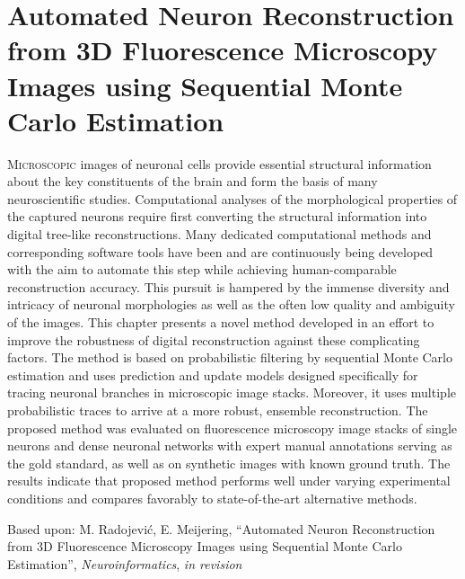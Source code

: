 %
%
\chpos{15mm}{8mm}
\chapter[Automated Neuron Reconstruction from 3D Fluorescence Microscopy Images using Sequential Monte Carlo Estimation]{Automated Neuron Reconstruction from 3D Fluorescence Microscopy Images using Sequential Monte Carlo Estimation}
\label{ch4:pnr}
{\small \lettrine{M}{icroscopic} images of neuronal cells provide essential structural information about the key constituents of the brain and form the basis of many neuroscientific studies. Computational analyses of the morphological properties of the captured neurons require first converting the structural information into digital tree-like reconstructions. Many dedicated computational methods and corresponding software tools have been and are continuously being developed with the aim to automate this step while achieving human-comparable reconstruction accuracy. This pursuit is hampered by the immense diversity and intricacy of neuronal morphologies as well as the often low quality and ambiguity of the images. This chapter presents a novel method developed in an effort to improve the robustness of digital reconstruction against these complicating factors. The method is based on probabilistic filtering by sequential Monte Carlo estimation and uses prediction and update models designed specifically for tracing neuronal branches in microscopic image stacks. Moreover, it uses multiple probabilistic traces to arrive at a more robust, ensemble reconstruction. The proposed method was evaluated on fluorescence microscopy image stacks of single neurons and dense neuronal networks with expert manual annotations serving as the gold standard, as well as on synthetic images with known ground truth. The results indicate that proposed method performs well under varying experimental conditions and compares favorably to state-of-the-art alternative methods.\par}
\vspace*{9em}
\begin{publish}
	Based upon: M. Radojevi\'{c}, E. Meijering, ``Automated Neuron Reconstruction from 3D Fluorescence Microscopy Images using Sequential Monte Carlo Estimation'', \textit{Neuroinformatics}, \textit{in revision}   
\end{publish}%
